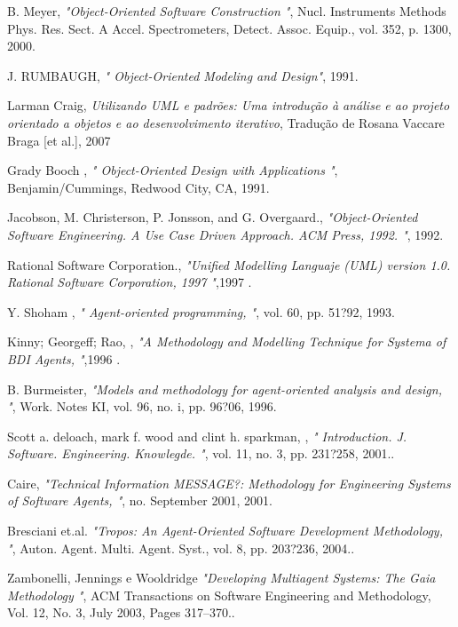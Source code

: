 \documentclass[10pt,letterpaper,twocolumn]{IEEEtran}
\begin{document}
\begin{thebibliography}{99}
	B. Meyer,
	\emph{"Object-Oriented Software Construction "}, Nucl. Instruments Methods Phys. Res. Sect. A Accel. Spectrometers, Detect. Assoc. Equip., vol. 352, p. 1300, 2000.
		
	 J. RUMBAUGH, 
	\emph{" Object-Oriented Modeling and Design"}, 1991.	
	
	Larman Craig,
	\emph{Utilizando UML e padrões: Uma introdução à análise e ao projeto orientado a objetos e ao desenvolvimento iterativo}, Tradução de Rosana Vaccare Braga [et al.], 2007
	
	Grady Booch ,
	\emph{" Object-Oriented Design with Applications "}, Benjamin/Cummings, Redwood City, CA, 1991.	
	
	 Jacobson, M. Christerson, P. Jonsson, and G. Overgaard.,
	\emph{"Object-Oriented Software Engineering. A Use Case Driven Approach. ACM Press, 1992. "}, 1992.
		
	 Rational Software Corporation.,
	\emph{"Unified Modelling Languaje (UML) version 1.0. Rational Software Corporation, 1997 "},1997 .
		
	 Y. Shoham ,
	\emph{" Agent-oriented programming, "}, vol. 60, pp. 51?92, 1993.
		
	 Kinny; Georgeff; Rao, ,
	\emph{"A Methodology and Modelling Technique for Systema of BDI Agents, "},1996 .
		
	 B. Burmeister,
	\emph{"Models and methodology for agent-oriented analysis and design, "}, Work. Notes KI, vol. 96, no. i, pp. 96?06, 1996.
		
	Scott a. deloach, mark f. wood and clint h. sparkman, ,
	\emph{" Introduction. J. Software. Engineering. Knowlegde. "}, vol. 11, no. 3, pp. 231?258, 2001..
		
	 Caire,
	\emph{"Technical Information MESSAGE?: Methodology for Engineering Systems of Software Agents, "}, no. September 2001, 2001.
	
Bresciani et.al.
\emph{"Tropos: An Agent-Oriented Software Development Methodology, "}, Auton. Agent. Multi. Agent. Syst., vol. 8, pp. 203?236, 2004..

Zambonelli, Jennings e Wooldridge
\emph{"Developing Multiagent Systems: The Gaia Methodology "}, ACM Transactions on Software Engineering and Methodology, Vol. 12, No. 3, July 2003, Pages 317–370..


\end{thebibliography}
\end{document}
